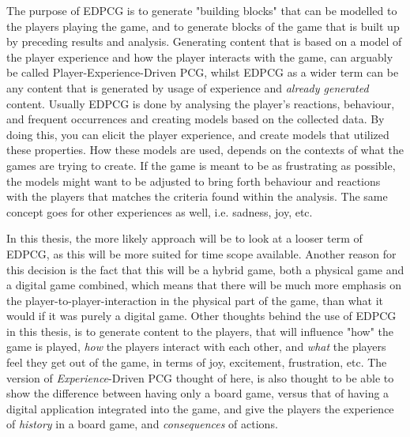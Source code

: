 The purpose of EDPCG is to generate "building blocks" that can be modelled to the players playing the game, and to generate blocks of the game that is built up by preceding results and analysis. Generating content that is based on a model of the player experience and how the player interacts with the game, can arguably be called Player-Experience-Driven PCG, whilst EDPCG as a wider term can be any content that is generated by usage of experience and \textit{already generated} content. Usually EDPCG is done by analysing the player's reactions, behaviour, and frequent occurrences and creating models based on the collected data. By doing this, you can elicit the player experience, and create models that utilized these properties. How these models are used, depends on the contexts of what the games are trying to create. If the game is meant to be as frustrating as possible, the models might want to be adjusted to bring forth behaviour and reactions with the players that matches the criteria found within the analysis. The same concept goes for other experiences as well, i.e. sadness, joy, etc.

In this thesis, the more likely approach will be to look at a looser term of EDPCG, as this will be more suited for time scope available.
Another reason for this decision is the fact that this will be a hybrid game, both a physical game and a digital game combined, which means that there will be much more emphasis on the player-to-player-interaction in the physical part of the game, than what it would if it was purely a digital game. Other thoughts behind the use of EDPCG in this thesis, is to generate content to the players, that will influence "how" the game is played, \textit{how} the players interact with each other, and \textit{what} the players feel they get out of the game, in terms of joy, excitement, frustration, etc. 
The version of \textit{Experience}-Driven PCG thought of here, is also thought to be able to show the difference between having only a board game, versus that of having a digital application integrated into the game, and give the players the experience of \textit{history} in a board game, and \textit{consequences} of actions.

